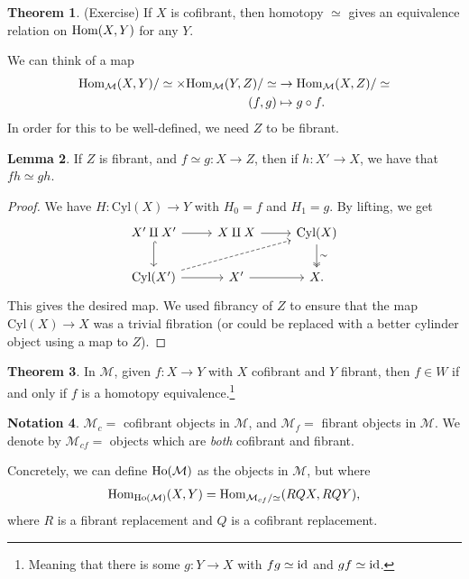 \documentclass[12pt]{amsart}
\theoremstyle{definition}
\newtheorem{theorem}{Theorem}[section]
\newtheorem{lemma}[theorem]{Lemma}
\newtheorem{notation}[theorem]{Notation}
\providecommand{\Cyl}{\text{Cyl}}
\begin{document}
\begin{theorem} (Exercise) If $X$ is cofibrant, then homotopy $\simeq$ gives an equivalence relation on $\text{Hom}(X,Y)$ for any $Y$.
\end{theorem}

We can think of a map
\begin{align*}
    \text{Hom}_\mathcal{M}(X,Y)/\simeq \times \text{Hom}_\mathcal{M}(Y,Z)/\simeq &\to \text{Hom}_\mathcal{M}(X,Z)/\simeq \\
    (f,g) &\mapsto g\circ f.
\end{align*}
In order for this to be well-defined, we need $Z$ to be fibrant.

\begin{lemma} If $Z$ is fibrant, and $f\simeq g: X \to Z$, then if $h: X' \to X$, we have that $fh\simeq gh$.
\end{lemma}
\begin{proof} We have $H: \Cyl(X) \to Y$ with $H_0 = f$ and $H_1 = g$. By lifting, we get
\[ \begin{tikzcd}
    X'\amalg X'\rar\dar[hook] & X\amalg X\rar & \Cyl(X)\dar[two heads,"\sim" right]\\
    \Cyl(X')\rar\ar[urr,dashed] & X'\rar & X.
\end{tikzcd} \]
This gives the desired map. We used fibrancy of $Z$ to ensure that the map $\Cyl(X) \to X$ was a trivial fibration (or could be replaced with a better cylinder object using a map to $Z$).
\end{proof}

\begin{theorem} In $\mathcal{M}$, given $f: X \to Y$ with $X$ cofibrant and $Y$ fibrant, then $f\in W$ if and only if $f$ is a homotopy equivalence.\footnote{Meaning that there is some $g: Y \to X$ with $fg\simeq \text{id}$ and $gf\simeq \text{id}$.}
\end{theorem}

\begin{notation} $\mathcal{M}_c=$ cofibrant objects in $\mathcal{M}$, and $\mathcal{M}_f=$ fibrant objects in $\mathcal{M}$. We denote by $\mathcal{M}_{cf}=$ objects which are \textit{both} cofibrant and fibrant.
\end{notation}

Concretely, we can define $\text{Ho}(\mathcal{M})$ as the objects in $\mathcal{M}$, but where
\begin{align*}
    \text{Hom}_{\text{Ho}(\mathcal{M})}(X,Y) = \text{Hom}_{\mathcal{M}_{cf}/\simeq}(RQX,RQY),
\end{align*}
where $R$ is a fibrant replacement and $Q$ is a cofibrant replacement.
\end{document}
